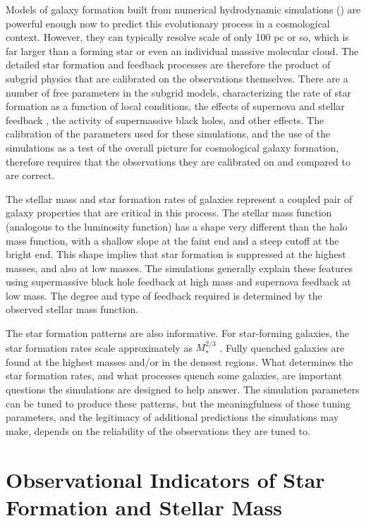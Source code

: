 Models of galaxy formation built from numerical hydrodynamic
simulations (\citet{2015MNRAS.452..575S, 2015MNRAS.450.1937C, 
2016MNRAS.462.3265D}) are powerful enough now to predict this evolutionary
process in a cosmological context. However, they can typically resolve
scale of only 100 pc or so, which is far larger than a forming star or
even an individual massive molecular cloud. The detailed star
formation and feedback processes are therefore the product of subgrid
physics \citep{2007MNRAS.380..963A} that are calibrated on the observations 
themselves. There are a number of free parameters in the subgrid models, characterizing the
rate of star formation as a function of local conditions, the effects
of supernova \citep{2013MNRAS.429.1922C} and stellar feedback 
\citep{2012MNRAS.421.3522H}, the activity of supermassive black holes, 
and other effects.  The calibration of the parameters used for
these simulations, and the use of the simulations as a test of the
overall picture for cosmological galaxy formation, therefore requires
that the observations they are calibrated on and compared to are
correct.

The stellar mass and star formation rates of galaxies represent a
coupled pair of galaxy properties that are critical in this process.
The stellar mass function (analogous to the luminosity function) has a
shape very different than the halo mass function, with a shallow slope
at the faint end and a steep cutoff at the bright end. This shape
implies that star formation is suppressed at the highest masses, and
also at low masses. The simulations generally explain these features
using supermassive black hole feedback at high mass and supernova
feedback at low mass. The degree and type of feedback required is
determined by the observed stellar mass function. 

The star formation patterns are also informative. For star-forming
galaxies, the star formation rates scale approximately as
$M_\ast^{2/3}$ \citep{2007ApJ...660L..43N}. Fully quenched galaxies are 
found at the highest masses and/or in the densest regions. What determines the 
star formation rates, and what processes quench some galaxies, are
important questions the simulations are designed to help answer. The
simulation parameters can be tuned to produce these patterns, but the
meaningfulness of those tuning parameters, and the legitimacy of
additional predictions the simulations may make, depends on the
reliability of the observations they are tuned to.


\section{Observational Indicators of Star Formation and Stellar Mass}
\label{sec: obs}

